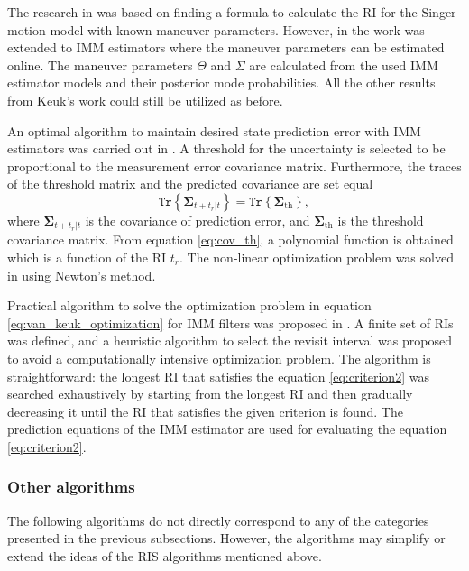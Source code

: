 \documentclass[english, 12pt, a4paper, elec, utf8, a-1b, online]{aaltothesis}
\renewcommand{\vec}[1]{\mathbf{#1}}
\newcommand{\tr}[1]{\texttt{Tr}\left\{ #1 \right\}}
\newcommand{\ri}{t_r}
\begin{document}
The research in \cite{Keuk1975, vanKeuk1993} was based on finding a formula to calculate the RI for the Singer motion model with known maneuver parameters.
However, in \cite{Shin1995} the work was extended to IMM estimators where the maneuver parameters can be estimated online.
The maneuver parameters $\Theta$ and $\Sigma$ are calculated from the used IMM estimator models and their posterior mode probabilities.
All the other results from Keuk's work could still be utilized as before.

An optimal algorithm to maintain desired state prediction error with IMM estimators was carried out in \cite{Watson1993}.
A threshold for the uncertainty is selected to be proportional to the measurement error covariance matrix.
Furthermore, the traces of the threshold matrix and the predicted covariance are set equal
\begin{equation}\label{eq:cov_th}
    \tr{ \vec{\Sigma}_{t+\ri|t} } = \tr{ \vec{\Sigma}_{\text{th}} },
\end{equation}
where $\vec{\Sigma}_{t+\ri|t}$ is the covariance of prediction error, and $\vec{\Sigma}_{\text{th}}$ is the threshold covariance matrix.
From equation \eqref{eq:cov_th}, a polynomial function is obtained which is a function of the RI $\ri$.
The non-linear optimization problem was solved in \cite{Watson1993} using Newton's method.

Practical algorithm to solve the optimization problem in equation \eqref{eq:van_keuk_optimization} for IMM filters was proposed in \cite{Daeipour1994}. A finite set of RIs was defined, and a heuristic algorithm to select the revisit interval was proposed to avoid a computationally intensive optimization problem.
The algorithm is straightforward: the longest RI that satisfies the equation \eqref{eq:criterion2} was searched exhaustively by starting from the longest RI and then gradually decreasing it until the RI that satisfies the given criterion is found. 
The prediction equations of the IMM estimator are used for evaluating the equation \eqref{eq:criterion2}.

\subsubsection{Other algorithms}

The following algorithms do not directly correspond to any of the categories presented in the previous subsections.
However, the algorithms may simplify or extend the ideas of the RIS algorithms mentioned above.
\end{document}
